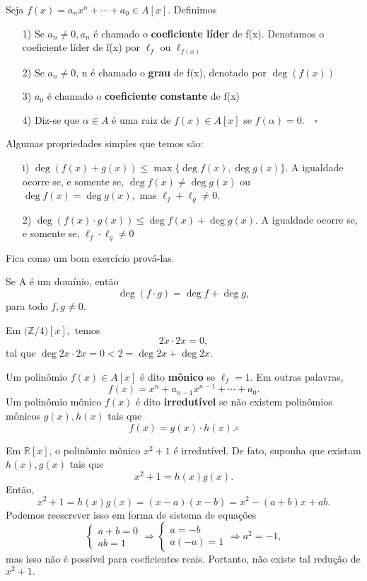 \documentclass[algebraII_notes.tex]{subfiles}
\begin{document}
\begin{def*}
	Seja \(f(x) = a_{n}x^{n} + \cdots + a_{0}\in A[x]\). Definimos
	\begin{itemize}
		\item[1)] Se \(a_{n}\neq0, a_{n}\) é chamado o \textbf{coeficiente líder} de f(x). Denotamos o coeficiente líder
		      de f(x) por \(\ell_{f}\) ou \(\ell_{f(x)}\)
		\item[2)] Se \(a_{n}\neq0\), n é chamado o \textbf{grau} de f(x), denotado por \(\deg(f(x))\)
		\item[3)] \(a_{0}\) é chamado o \textbf{coeficiente constante} de f(x)
		\item[4)] Diz-se que \(\alpha\in A\) é uma raiz de \(f(x)\in A[x]\) se \(f(\alpha ) = 0.\quad\square\)
	\end{itemize}
\end{def*}
Algumas propriedades simples que temos são:
\begin{itemize}
	\item[i)] \(\deg{(f(x) + g(x))}\leq \max\{\deg{f(x)}, \deg{g(x)}\}\). A igualdade ocorre se, e somente se,
	      \(\deg{f(x)}\neq \deg{g(x)}\) ou \(\deg{f(x)}=\deg{g(x)},\) mas \(\ell_{f} + \ell_{g}\neq0.\)
	\item[2)] \(\deg{(f(x)\cdot g(x))}\leq \deg{f(x)} + \deg{g(x)}.\) A igualdade ocorre se, e somente se,
	      \(\ell_{f}\cdot \ell_{g} \neq0\)
\end{itemize}
Fica como um bom exercício prová-las.
\begin{example}
	Se A é um domínio, então
	\[
		\deg{(f \cdot g)} = \deg{f} + \deg{g},
	\]
	para todo \(f, g\neq0.\)
\end{example}
\begin{example}
	Em \(\biggl(\mathbb{Z}/4\biggr)[x],\) temos
	\[
		2x \cdot 2x = 0,
	\]
	tal que \(\deg{2x \cdot 2x} = 0 < 2 = \deg{2x} + \deg{2x}.\)
\end{example}
\begin{def*}
	Um polinômio \(f(x)\in A[x]\) é dito \textbf{mônico} se \(\ell_{f} = 1.\) Em outras palavras,
	\[
		f(x) = x^{n} + a_{n-1}x^{n-1} + \cdots + a_{0}.
	\]
	Um polinômio mônico \(f(x)\) é dito \textbf{irredutível} se não existem polinômios mônicos
	\(g(x), h(x)\) tais que
	\[
		f(x) = g(x)\cdot h(x).\square
	\]
\end{def*}
\begin{example}
	Em \(\mathbb{R}[x]\), o polinômio mônico \(x^{2} + 1\) é irredutível. De fato, suponha que existam
	\(h(x), g(x)\) tais que
	\[
		x^{2} + 1 = h(x)g(x).
	\]
	Então,
	\[
		x^{2} + 1 = h(x)g(x) = (x-a)(x-b) = x^{2} - (a+b)x +ab.
	\]
	Podemos reescrever isso em forma de sistema de equações
	\[
		\left\{\begin{array}{ll}
			a + b = 0 \\
			ab = 1
		\end{array}\right.
		\Rightarrow
		\left\{\begin{array}{ll}
			a = -b \\
			a(-a) = 1
		\end{array}\right.
		\Rightarrow
		a^{2} = -1,
	\]
	mas isso não é possível para coeficientes reais. Portanto, não existe tal redução de \(x^{2} + 1.\)
\end{example}
\end{document}
